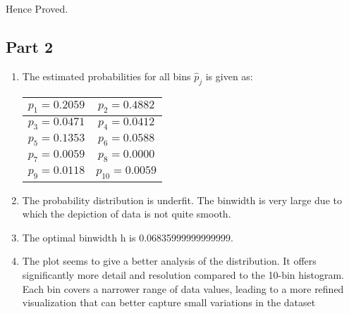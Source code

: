 Hence Proved.
\subsection{Part 2}

\begin{enumerate}[label=(\alph*)]
	\item The estimated probabilities for all bins $\hat{p}_j$ is given as:
	      \begin{center}
		      \begin{tabular}{|c|c|}
			      \hline
			      $p_1 = 0.2059$ & $p_2 = 0.4882$    \\ \hline
			      $p_3 = 0.0471$ & $p_4 = 0.0412$    \\\hline
			      $p_5 = 0.1353$ & $p_6 = 0.0588$    \\\hline
			      $p_7 = 0.0059$ & $p_8 = 0.0000$    \\\hline
			      $p_9 = 0.0118$ & $p_{10} = 0.0059$ \\ \hline
		      \end{tabular}
	      \end{center}
	\item  The probability distribution is underfit. The binwidth is very large due to which the depiction of data is not quite smooth.
	\item  The optimal binwidth h is 0.06835999999999999.
	\item  The plot seems to give a better analysis of the distribution. It  offers
	      significantly more detail and resolution compared to the 10-bin histogram. Each
	      bin covers a narrower range of data values, leading to a more refined
	      visualization that can better capture small variations in the dataset
\end{enumerate}
